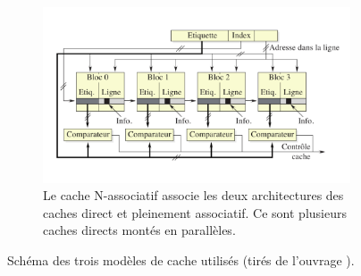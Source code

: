 \begin{figure}
    \begin{subfigure}[b]{0.45\linewidth}
        \includegraphics[width=\linewidth]{images/cache_circuit-set-associative.png}
        \caption{Le cache N-associatif associe les deux architectures des caches direct et pleinement associatif. Ce sont plusieurs caches directs montés en parallèles.}
        \label{pic:cache_circuit-set-associative}
    \end{subfigure}
    
    \caption{Schéma des trois modèles de cache utilisés (tirés de l'ouvrage \cite{Blanchet2013}).}\label{fig:cache_schema}
\end{figure}





